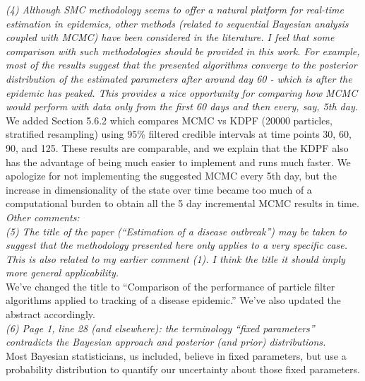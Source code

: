 \documentclass{article}
\begin{document}
\noindent \emph{(4) Although SMC methodology seems to offer a natural platform for real-time estimation in epidemics, other methods (related to sequential Bayesian analysis coupled with MCMC) have been considered in the literature. I feel that some comparison with such methodologies should be provided in this work. For example, most of the results suggest that the presented algorithms converge to the posterior distribution of the estimated parameters after around day 60 - which is after the epidemic has peaked. This provides a nice opportunity for comparing how MCMC would perform with data only from the first 60 days and then every, say, 5th day.} \\

We added Section 5.6.2  which compares MCMC vs KDPF (20000 particles, stratified resampling) using 95\% filtered credible intervals at time points 30, 60, 90, and 125. These results are comparable, and we explain that the KDPF also has the advantage of being much easier to implement and runs much faster. We apologize for not implementing the suggested MCMC every 5th day, but the increase in dimensionality of the state over time became too much of a computational burden to obtain all the 5 day incremental MCMC results in time.  \\

\noindent \emph{Other comments:} \\

\noindent \emph{(5) The title of the paper  (``Estimation of a disease outbreak'') may be taken to suggest that the methodology presented here only applies to a very specific case. This is also related to my earlier comment (1). I think the title  it should imply more general applicability.} \\

We've changed the title to ``Comparison of the performance of particle filter algorithms applied to tracking of a disease epidemic.'' We've also updated the abstract accordingly. \\

\noindent \emph{(6) Page 1, line 28 (and elsewhere): the terminology ``fixed parameters'' contradicts the Bayesian approach and posterior (and prior) distributions.} \\

Most Bayesian statisticians, us included, believe in fixed parameters, but use a probability distribution to quantify our uncertainty about those fixed parameters. \\
\end{document}
